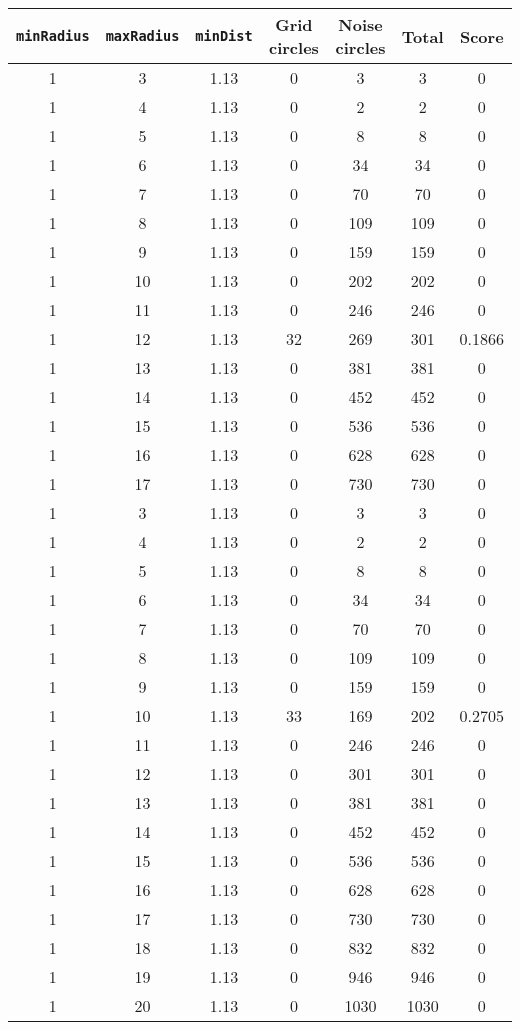 \documentclass[letterpaper, 12pt]{article}
\begin{document}
\begin{longtable}{|c|c|c|c|c|c|c|}
\hline
\textbf{\texttt{minRadius}} & \textbf{\texttt{maxRadius}} & \textbf{\texttt{minDist}} & \textbf{Grid circles} & \textbf{Noise circles} & \textbf{Total} & \textbf{Score} \\
\hline
1 & 3 & 1.13 & 0 & 3 & 3 & 0 \\
\hline
1 & 4 & 1.13 & 0 & 2 & 2 & 0 \\
\hline
1 & 5 & 1.13 & 0 & 8 & 8 & 0 \\
\hline
1 & 6 & 1.13 & 0 & 34 & 34 & 0 \\
\hline
1 & 7 & 1.13 & 0 & 70 & 70 & 0 \\
\hline
1 & 8 & 1.13 & 0 & 109 & 109 & 0 \\
\hline
1 & 9 & 1.13 & 0 & 159 & 159 & 0 \\
\hline
1 & 10 & 1.13 & 0 & 202 & 202 & 0 \\
\hline
1 & 11 & 1.13 & 0 & 246 & 246 & 0 \\
\hline
1 & 12 & 1.13 & 32 & 269 & 301 & 0.1866 \\
\hline
1 & 13 & 1.13 & 0 & 381 & 381 & 0 \\
\hline
1 & 14 & 1.13 & 0 & 452 & 452 & 0 \\
\hline
1 & 15 & 1.13 & 0 & 536 & 536 & 0 \\
\hline
1 & 16 & 1.13 & 0 & 628 & 628 & 0 \\
\hline
1 & 17 & 1.13 & 0 & 730 & 730 & 0 \\
\hline
1 & 3 & 1.13 & 0 & 3 & 3 & 0 \\
\hline
1 & 4 & 1.13 & 0 & 2 & 2 & 0 \\
\hline
1 & 5 & 1.13 & 0 & 8 & 8 & 0 \\
\hline
1 & 6 & 1.13 & 0 & 34 & 34 & 0 \\
\hline
1 & 7 & 1.13 & 0 & 70 & 70 & 0 \\
\hline
1 & 8 & 1.13 & 0 & 109 & 109 & 0 \\
\hline
1 & 9 & 1.13 & 0 & 159 & 159 & 0 \\
\hline
1 & 10 & 1.13 & 33 & 169 & 202 & 0.2705 \\
\hline
1 & 11 & 1.13 & 0 & 246 & 246 & 0 \\
\hline
1 & 12 & 1.13 & 0 & 301 & 301 & 0 \\
\hline
1 & 13 & 1.13 & 0 & 381 & 381 & 0 \\
\hline
1 & 14 & 1.13 & 0 & 452 & 452 & 0 \\
\hline
1 & 15 & 1.13 & 0 & 536 & 536 & 0 \\
\hline
1 & 16 & 1.13 & 0 & 628 & 628 & 0 \\
\hline
1 & 17 & 1.13 & 0 & 730 & 730 & 0 \\
\hline
1 & 18 & 1.13 & 0 & 832 & 832 & 0 \\
\hline
1 & 19 & 1.13 & 0 & 946 & 946 & 0 \\
\hline
1 & 20 & 1.13 & 0 & 1030 & 1030 & 0 \\
\hline
\end{longtable}
\end{document}
